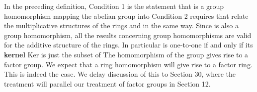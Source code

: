 \documentclass[11pt,oneside]{article}
\begin{document}
\begin{BookBody}
In the preceding definition, Condition 1 is the statement that \BookInline{\phi } is a group homomorphism mapping the abelian group  into  Condition 2 requires that \BookInline{\phi } relate the multiplicative structures of the rings  and  in the same way. Since \BookInline{\phi } is also a group homomorphism, all the results concerning group homomorphisms are valid for the additive structure of the rings. In particular\BookInline{,\allowbreak \phi } is one-to-one if and only if its\textbf{ kernel} Ker is just the subset  of  The homomorphism \BookInline{\phi } of the group  gives rise to a factor group. We expect that a ring homomorphism will give rise to a factor ring. This is indeed the case. We delay discussion of this to Section 30, where the treatment will parallel our treatment of factor groups in Section 12.

\end{BookBody}

\BookNarrativetrue
\end{document}

